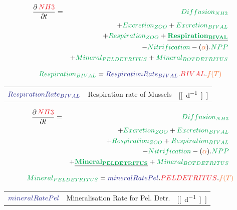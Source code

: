 \documentclass[final,xcolor=dvipsnames]{beamer}
\begin{document}
            \begin{frame}   
	\begin{exampleblock}{}
	  \begin{eqnarray*}
	    \small
	    \frac{\partial\,\varC[NH3]}{\partial t} & = & \proC[Diffusion_{NH3}] \\
	    & & +  \proC[Excretion_{ZOO}] + \proC[Excretion_{BIVAL}] \\
	& &+ \proC[Respiration_{ZOO}] + \underline{\mathbf{\proC[Respiration_{BIVAL}]}}\\
	    & & - \proC[Nitrification]  - (\worC[\alpha]).\proC[NPP] \\
	    & & + \proC[Mineral_{PELDETRITUS}] + \proC[Mineral_{BOTDETRITUS}] \\
	  \end{eqnarray*}
	\end{exampleblock}
	\begin{exampleblock}{}
	  \begin{equation*}
	    \proC[Respiration_{BIVAL}] = \parC[RespirationRate_{BIVAL}] . \varC[BIVAL] .\worC[f(T)]
	  \end{equation*}
	  \begin{tabular}{ l l l }
	    $\parC[RespirationRate_{BIVAL}]$ &  Respiration rate of Mussels &  [\unit[d^{-1}]] 
	  \end{tabular}
	    \end{exampleblock}
      \end{frame}
      
      
        \begin{frame}   
	\begin{exampleblock}{}
	  \begin{eqnarray*}
	    \small
	    \frac{\partial\,\varC[NH3]}{\partial t} & = & \proC[Diffusion_{NH3}] \\
	    & & +  \proC[Excretion_{ZOO}] + \proC[Excretion_{BIVAL}] \\
	    & & + \proC[Respiration_{ZOO}] + \proC[Respiration_{BIVAL}]\\
	    & & - \proC[Nitrification]  - (\worC[\alpha]).\proC[NPP] \\
	    & & + \underline{\mathbf{\proC[Mineral_{PELDETRITUS}]}} + \proC[Mineral_{BOTDETRITUS}] \\
	  \end{eqnarray*}
	\end{exampleblock}
	\begin{exampleblock}{}
	  \begin{equation*}
	    \proC[Mineral_{PELDETRITUS}] = \parC[mineralRatePel].\varC[PELDETRITUS].\worC[f(T)]
	  \end{equation*}
	  \begin{tabular}{ l l l }
	    $\parC[mineralRatePel]$ &  Mineralisation Rate for Pel. Detr. &  [\unit[d^{-1}]] 
	  \end{tabular}
	    \end{exampleblock}
      \end{frame}
      
\end{document}
